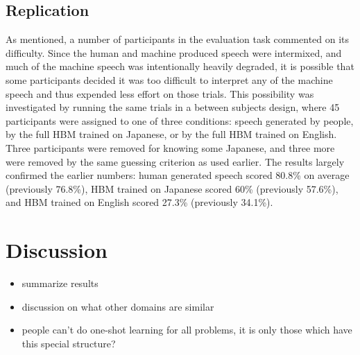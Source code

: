 \documentclass[10pt,letterpaper]{article}
\begin{document}
\subsection{Replication}
As mentioned, a number of participants in the evaluation task commented on its difficulty. Since the human and machine produced speech were intermixed, and much of the machine speech was intentionally heavily degraded, it is possible that some participants decided it was too difficult to interpret any of the machine speech and thus expended less effort on those trials. This possibility was investigated by running the same trials in a between subjects design, where 45 participants were assigned to one of three conditions: speech generated by people, by the full HBM trained on Japanese, or by the full HBM trained on English. Three participants were removed for knowing some Japanese, and three more were removed by the same guessing criterion as used earlier. The results largely confirmed the earlier numbers: human generated speech scored 80.8\% on average (previously 76.8\%), HBM trained on Japanese scored 60\% (previously 57.6\%), and HBM trained on English scored 27.3\% (previously 34.1\%). 

\section{Discussion}

\begin{itemize}
\item summarize results
\item discussion on what other domains are similar
\item people can't do one-shot learning for all problems, it is only those which have this special structure?
\end{itemize}


\setlength{\bibleftmargin}{.125in}
\setlength{\bibindent}{-\bibleftmargin}


\end{document}
